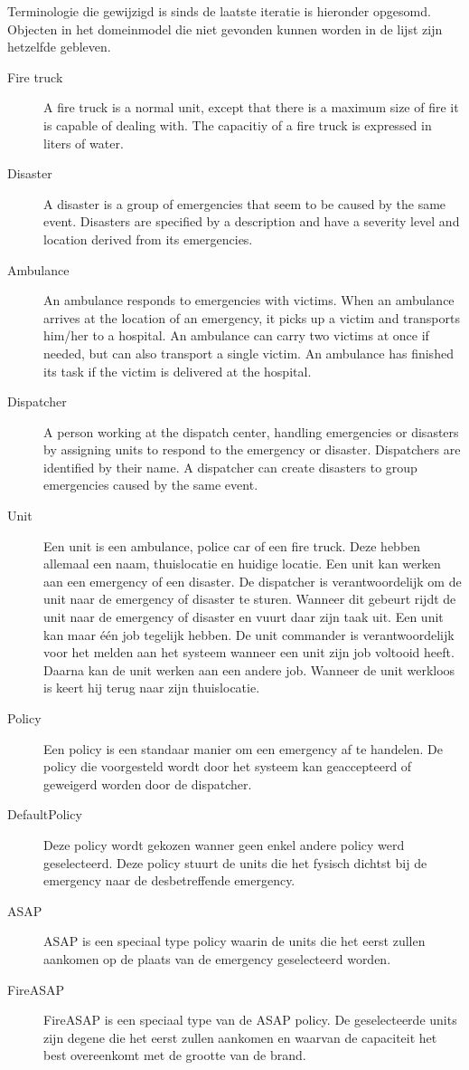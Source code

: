 \label{terminologie}
Terminologie die gewijzigd is sinds de laatste iteratie is hieronder opgesomd. Objecten in het domeinmodel die niet gevonden kunnen worden in de lijst zijn hetzelfde gebleven. 
\begin{description}
  \item[Fire truck] A fire truck is a normal unit, except that there is a maximum size of fire it is capable of dealing with. The capacitiy of a fire truck is expressed in liters of water.
  \item[Disaster] A disaster is a group of emergencies that seem to be caused by the same event. Disasters are specified by a description and have a severity level and location derived from its emergencies.
  \item[Ambulance] An ambulance responds to emergencies with victims. When an ambulance arrives at the location of an emergency, it picks up a victim and transports him/her to a hospital. An ambulance can carry two victims at once if needed, but can also transport a single victim. An ambulance has finished its task if the victim is delivered at the hospital. 
  \item[Dispatcher] A person working at the dispatch center, handling emergencies or disasters by assigning units to respond to the emergency or disaster. Dispatchers are identified by their name. A dispatcher can create disasters to group emergencies caused by the same event.
  \item[Unit] Een unit is een ambulance, police car of een fire truck. Deze hebben allemaal een naam, thuislocatie en huidige locatie. Een unit kan werken aan een emergency of een disaster. De dispatcher is verantwoordelijk om de unit naar de emergency of disaster te sturen. Wanneer dit gebeurt rijdt de unit naar de emergency of disaster en vuurt daar zijn taak uit. Een unit kan maar \'e\'en job tegelijk hebben. De unit commander is verantwoordelijk voor het melden aan het systeem wanneer een unit zijn job voltooid heeft. Daarna kan de unit werken aan een andere job. Wanneer de unit werkloos is keert hij terug naar zijn thuislocatie.
  \item[Policy]  Een policy is een standaar manier om een emergency af te handelen. De policy die voorgesteld wordt door het systeem kan geaccepteerd of geweigerd worden door de dispatcher.
  \item[DefaultPolicy] Deze policy wordt gekozen wanner geen enkel andere policy werd geselecteerd. Deze policy stuurt de units die het fysisch dichtst bij de emergency naar de desbetreffende emergency.
  \item[ASAP] ASAP is een speciaal type policy waarin de units die het eerst zullen aankomen op de plaats van de emergency geselecteerd worden.
  \item[FireASAP] FireASAP is een speciaal type van de ASAP policy. De geselecteerde units zijn degene die het eerst zullen aankomen en waarvan de capaciteit het best overeenkomt met de grootte van de brand.
\end{description}
